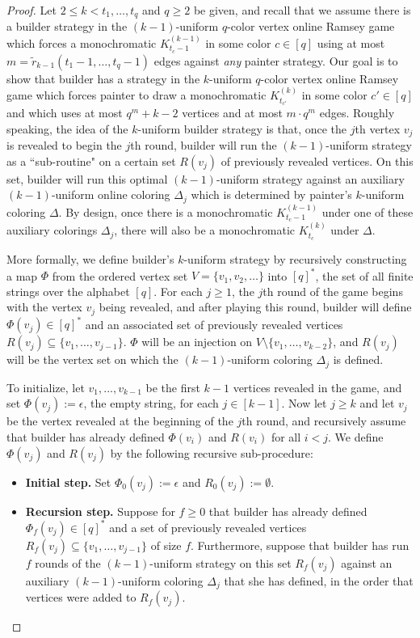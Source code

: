 \documentclass[A4paper,reqno,oneside,12pt]{amsart}
\theoremstyle{plain}
\theoremstyle{definition}
\def\e{\epsilon}
\begin{document}
\begin{proof}
Let $2 \leq k < t_1, \dots, t_q$ and $q \geq 2$ be given, and recall that we assume there is a builder strategy in the $(k-1)$-uniform $q$-color vertex online Ramsey game which forces a
monochromatic $K_{t_c-1}^{(k-1)}$ in some color $c \in [q]$ using
at most $m = \tilde{r}_{k-1}(t_1-1,\dots, t_q-1)$ edges against {\it any} painter strategy.
Our goal is to show that builder has a strategy in the $k$-uniform $q$-color vertex online Ramsey game which forces painter to draw a
monochromatic $K_{t_{c'}}^{(k)}$ in some color $c' \in [q]$
and which uses at most $q^m + k-2$ vertices and at most $m \cdot q^m$ edges.
Roughly speaking, the idea of the $k$-uniform builder strategy is that, once the $j$th vertex $v_j$ is revealed to begin the $j$th round, builder will run the $(k-1)$-uniform strategy as a ``sub-routine" on a certain set $R(v_j)$ of previously revealed vertices.
On this set, builder will run this optimal $(k-1)$-uniform strategy against an auxiliary $(k-1)$-uniform online coloring $\Delta_j$ which is determined by painter's $k$-uniform coloring $\Delta$.
By design, once there is a monochromatic $K_{t_c-1}^{(k-1)}$ under one of these auxiliary colorings $\Delta_j$, there will also be a monochromatic $K_{t_c}^{(k)}$ under $\Delta$.

More formally, we define builder's $k$-uniform strategy by recursively constructing a map $\Phi$ from the ordered vertex set $V = \{v_1, v_2, \dots\}$ into 
$[q]^*$, the set of all finite strings over the alphabet $[q]$.
For each $j \geq 1$, the $j$th round of the game begins with the vertex $v_j$ being revealed, and after playing this round, builder will define $\Phi(v_j) \in [q]^*$ and an associated set of previously revealed vertices $R(v_j) \subseteq \{v_1, \dots, v_{j-1}\}$.
$\Phi$ will be an injection on $V \setminus \{v_1, \dots, v_{k-2}\}$, and $R(v_j)$ will be the vertex set on which the $(k-1)$-uniform coloring $\Delta_j$ is defined.

To initialize, let $v_1, ..., v_{k-1}$ be the first $k-1$ vertices revealed in the game, and set
$\Phi(v_j) := \e$, the empty string, for each $j \in [k-1]$.
Now let $j \geq k$ and let $v_j$ be the vertex revealed at the beginning of the $j$th round, and recursively assume that builder has already defined $\Phi(v_i)$ and $R(v_i)$ for all $i < j$.
We define $\Phi(v_j)$ and $R(v_j)$ by the following recursive sub-procedure:
\begin{itemize}
    \item {\bf Initial step.} Set $\Phi_0(v_j) := \e$ and $R_0(v_j) := \emptyset$.
    \item {\bf Recursion step.} Suppose for $f \geq 0$ that builder has already defined $\Phi_f(v_j) \in [q]^*$ and a set of previously revealed vertices $R_f(v_j) \subseteq \{v_1, \dots, v_{j-1}\}$ of size $f$.
    Furthermore, suppose that builder has run $f$ rounds of the $(k-1)$-uniform strategy on this set $R_f(v_j)$ against an auxiliary $(k-1)$-uniform coloring $\Delta_j$ that she has defined, in the order that vertices were added to $R_f(v_j)$.
    

\end{itemize}
\end{proof}
\end{document}
